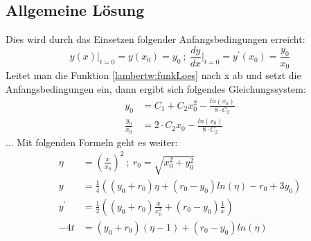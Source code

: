 \subsection{Allgemeine Lösung 
	\label{lambertw:subsection:AllgLoes}}
Dies wird durch das Einsetzen folgender Anfangsbedingungen erreicht:
\begin{equation}
	y(x)\big \vert_{t=0}
	=
	y(x_0)
	= 
	y_0
	\:;\:
	\frac{dy}{dx}\bigg \vert_{t=0}
	=
	y^{\prime}(x_0)
	=
	\frac{y_0}{x_0}
\end{equation}
Leitet man die Funktion \eqref{lambertw:funkLoes} nach x ab und setzt die Anfangsbedingungen ein, dann ergibt sich folgendes Gleichungssystem:
\begin{subequations}
	\begin{align}
		y_0
		&=
		C_1 + C_2 x^2_0 - \frac{ln(x_0)}{8 \cdot C_2} \\
		\frac{y_0}{x_0}
		&=
		 2 \cdot  C_2 x_0 - \frac{ln(x_0)}{8 \cdot C_2}
	\end{align}
\end{subequations}
... Mit folgenden Formeln geht es weiter:
\begin{align*}
	\eta
	&=
	\left(\frac{x}{x_0}\right)^2 
	\:;\:
	r_0
	=
	\sqrt{x_0^2+y_0^2} \\
	y
	&=
	\frac{1}{4}\left(\left(y_0+r_0\right)\eta+\left(r_0-y_0\right)ln\left(\eta\right)-r_0+3y_0\right) \\
	y^\prime
	&=
	\frac{1}{2}\left(\left(y_0+r_0\right)\frac{x}{x_0^2}+\left(r_0-y_0\right)\frac{1}{x}\right) \\
	-4t
	&=
	\left(y_0+r_0\right)\left(\eta-1\right)+\left(r_0-y_0\right)ln\left(\eta\right)
\end{align*}

